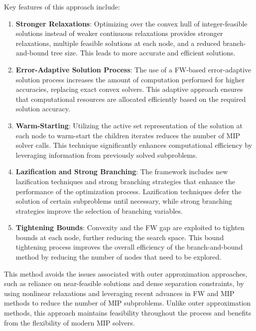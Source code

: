 Key features of this approach include:
\begin{enumerate}
	\item \textbf{Stronger Relaxations}: Optimizing over the convex hull of integer-feasible solutions instead of weaker continuous relaxations provides stronger relaxations, multiple feasible solutions at each node, and a reduced branch-and-bound tree size. This leads to more accurate and efficient solutions.
	
	\item \textbf{Error-Adaptive Solution Process}: The use of a FW-based error-adaptive solution process increases the amount of computation performed for higher accuracies, replacing exact convex solvers. This adaptive approach ensures that computational resources are allocated efficiently based on the required solution accuracy.
	
	\item \textbf{Warm-Starting}: Utilizing the active set representation of the solution at each node to warm-start the children iterates reduces the number of MIP solver calls. This technique significantly enhances computational efficiency by leveraging information from previously solved subproblems.
	
	\item \textbf{Lazification and Strong Branching}: The framework includes new lazification techniques and strong branching strategies that enhance the performance of the optimization process. Lazification techniques defer the solution of certain subproblems until necessary, while strong branching strategies improve the selection of branching variables.
	
	\item \textbf{Tightening Bounds}: Convexity and the FW gap are exploited to tighten bounds at each node, further reducing the search space. This bound tightening process improves the overall efficiency of the branch-and-bound method by reducing the number of nodes that need to be explored.
\end{enumerate}

This method avoids the issues associated with outer approximation approaches, such as reliance on near-feasible solutions and dense separation constraints, by using nonlinear relaxations and leveraging recent advances in FW and MIP methods to reduce the number of MIP subproblems. Unlike outer approximation methods, this approach maintains feasibility throughout the process and benefits from the flexibility of modern MIP solvers.


